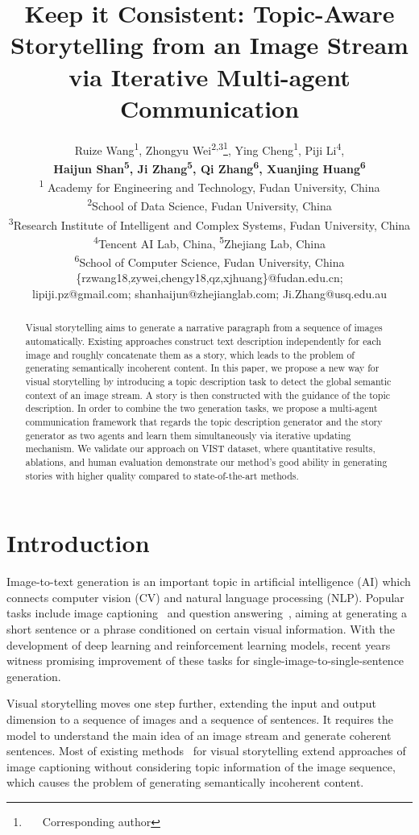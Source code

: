 \documentclass[11pt]{article}
\title{Keep it Consistent: Topic-Aware Storytelling from an Image Stream via Iterative Multi-agent Communication}
\author{Ruize Wang\textsuperscript{\rm 1}, Zhongyu Wei\textsuperscript{\rm 2,\rm3}\thanks{~~~Corresponding author}, 
Ying Cheng\textsuperscript{\rm 1}, Piji Li\textsuperscript{\rm 4}, \\ \textbf{ Haijun Shan\textsuperscript{\rm 5}, Ji Zhang\textsuperscript{\rm 5}, 
Qi Zhang\textsuperscript{\rm 6}, 
Xuanjing Huang\textsuperscript{\rm 6}}\\ \textsuperscript{\rm 1}	Academy for Engineering and Technology, Fudan University, China\\
\textsuperscript{\rm 2}School of Data Science, Fudan University, China\\ 
\textsuperscript{\rm 3}Research Institute of Intelligent and Complex Systems, Fudan University, China\\
\textsuperscript{\rm 4}Tencent AI Lab, China, \textsuperscript{\rm 5}Zhejiang Lab, China\\ 
\textsuperscript{\rm 6}School of Computer Science, Fudan University, China\\
\{rzwang18,zywei,chengy18,qz,xjhuang\}@fudan.edu.cn; \\ lipiji.pz@gmail.com; shanhaijun@zhejianglab.com; Ji.Zhang@usq.edu.au
}
\date{}
\newcommand{\citep}{\cite}
\begin{document}
\maketitle
\begin{abstract}
Visual storytelling aims to generate a narrative paragraph from a sequence of images automatically. Existing approaches construct text description independently for each image and roughly concatenate them as a story, which leads to the problem of generating semantically incoherent content. In this paper, we propose a new way for visual storytelling by introducing a topic description task to detect the global semantic context of an image stream. A story is then constructed with the guidance of the topic description. In order to combine the two generation tasks, we propose a multi-agent communication framework that regards the topic description generator and the story generator as two agents and learn them simultaneously via iterative updating mechanism. We validate our approach on VIST dataset, where quantitative results, ablations, and human evaluation demonstrate our method's good ability in generating stories with higher quality compared to state-of-the-art methods.

\end{abstract}

\section{Introduction}

Image-to-text generation is an important topic in artificial intelligence (AI) which connects computer vision (CV) and natural language processing (NLP). Popular tasks include image captioning~\citep{karpathy2015deep,ren2017deep,vinyals2017show} and question answering~\citep{Antol2015VQAVQ,Yu2017vqa,singh2019vqa}, aiming at generating a short sentence or a phrase conditioned on certain visual information. With the development of deep learning and reinforcement learning models, recent years witness promising improvement of these tasks for single-image-to-single-sentence generation. 

Visual storytelling moves one step further, extending the input and output dimension to a sequence of images and a sequence of sentences. It requires the model to understand the main idea of an image stream and generate coherent sentences. Most of existing methods~\citep{huang2016visual,liu2016storytelling,yu2017hierarchically,wang2018show,wang2020storytelling} for visual storytelling extend approaches of image captioning without considering topic information of the image sequence, which causes the problem of generating semantically incoherent content. 
\end{document}
